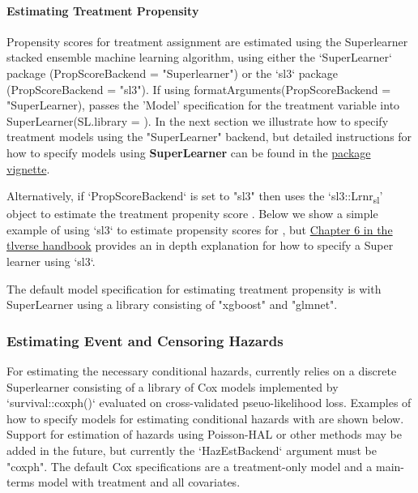 \documentclass{report}
\newcommand{\1}{\ensuremath{\mathbf{1}}}
\begin{document}
\paragraph{Estimating Treatment Propensity}
Propensity scores for treatment assignment are estimated using the Superlearner stacked ensemble machine learning algorithm, using either the `SuperLearner` package (PropScoreBackend = "Superlearner") or the `sl3` package (PropScoreBackend = "sl3").  If using formatArguments(PropScoreBackend = "SuperLearner),   passes the 'Model' specification for the treatment variable into SuperLearner(SL.library = ). In the next section we illustrate how to specify treatment models using the "SuperLearner" backend, but detailed instructions for how to specify models using \textbf{SuperLearner} can be found in the \href{https://cran.r-project.org/web/packages/SuperLearner/vignettes/Guide-to-SuperLearner.html}{package vignette}.

Alternatively, if `PropScoreBackend` is set to "sl3" then  uses the `sl3::Lrnr\textsubscript{sl}' object to estimate the treatment propenity score . Below we show a simple example of using `sl3` to estimate propensity scores for , but  \href{https://tlverse.org/tlverse-handbook/sl3.html}{Chapter 6 in the tlverse handbook} provides an in depth explanation for how to specify a Super learner using `sl3`.

The default model specification for estimating treatment propensity is with SuperLearner using a library consisting of "xgboost" and "glmnet".

\subsubsection{Estimating Event and Censoring Hazards}

For estimating the necessary conditional hazards,  currently relies on a discrete Superlearner consisting of a library of Cox models implemented by `survival::coxph()` evaluated on cross-validated pseuo-likelihood loss. Examples of how to specify models for estimating conditional hazards with  are shown below. Support for estimation of hazards using Poisson-HAL or other methods may be added in the future, but currently the `HazEstBackend` argument must be "coxph". The default Cox specifications are a treatment-only model and a main-terms model with treatment and all covariates.  
\end{document}
